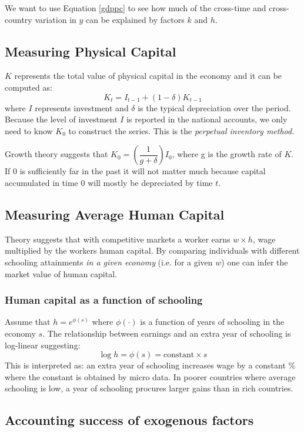 \documentclass[11pt]{article}
\begin{document}
We want to use Equation \eqref{gdppc} to see how much of the cross-time and cross-country variation in $y$ can be explained by factors $k$ and $h$.

\subsection{Measuring Physical Capital}
$K$ represents the total value of physical capital in the economy and it can be computed as:
\[K_t = I_{t-1} + (1-\delta)K_{t-1}\]
where $I$ represents investment and $\delta$ is the typical depreciation over the period. Because the level of investment $I$ is reported in the national accounts, we only need to know $K_0$ to construct the series. This is the \textit{perpetual inventory method.}

Growth theory suggests that $K_0 = \left( \dfrac{1}{g+\delta}\right) I_0$, where g is the growth rate of $K$. If 0 is sufficiently far in the past it will  not matter much because capital accumulated in time 0 will mostly be depreciated by time $t.$

\subsection{Measuring Average Human Capital}

Theory suggests that with competitive markets a worker earns $w \times h$, wage multiplied by the workers human capital. By comparing individuals with different schooling attainments \textit{in a given economy} (i.e. for a given $w$) one can infer the market value of human capital.
\subsubsection{Human capital as a function of schooling}

Assume that $h = e^{\phi(s)}$ where $\phi(\cdot)$ is a function of years of schooling in the economy $s$. The relationship between earnings and an extra year of schooling is log-linear suggesting:
\[\log h = \phi(s) = \text{constant} \times s\]
This is interpreted as: an extra year of schooling increases wage by a constant \% where the constant is obtained by micro data. In poorer countries where average schooling is low, a year of schooling procures larger gains than in rich countries.

\subsection{Accounting success of exogenous factors}
\end{document}
